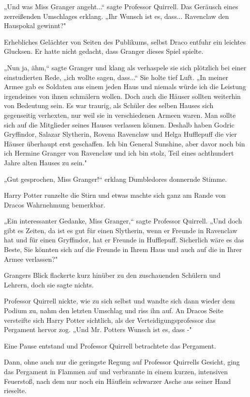 {„Und was Miss Granger angeht...“ sagte Professor Quirrell. Das Geräusch eines zerreißenden Umschlages erklang. „Ihr Wunsch ist es, dass... Ravenclaw den Hauspokal gewinnt?"

Erhebliches Gelächter von Seiten des Publikums, selbst Draco entfuhr ein leichtes Glucksen. Er hatte nicht gedacht, dass Granger dieses Spiel spielte.

„Nun ja, ähm,“ sagte Granger und klang als verhaspele sie sich plötzlich bei einer einstudierten Rede, „ich wollte sagen, dass...“ Sie holte tief Luft. „In meiner Armee gab es Soldaten aus einem jeden Haus und niemals würde ich die Leistung irgendeines von ihnen schmälern wollen. Doch auch die Häuser sollten weiterhin von Bedeutung sein. Es war traurig, als Schüler des selben Hauses sich gegenseitig verhexten, nur weil sie in verschiedenen Armeen waren. Man sollte sich auf die Mitglieder seines Hauses verlassen können. Deshalb haben Godric Gryffindor, Salazar Slytherin, Rovena Ravenclaw und Helga Hufflepuff die vier Häuser überhaupt erst geschaffen. Ich bin General Sunshine, aber davor noch bin ich Hermine Granger von Ravenclaw und ich bin stolz, Teil eines achthundert Jahre alten Hauses zu sein."

„Gut gesprochen, Miss Granger!“ erklang Dumbledores donnernde Stimme.

Harry Potter runzelte die Stirn und etwas machte sich ganz am Rande von Dracos Wahrnehmung bemerkbar.

„Ein interessanter Gedanke, Miss Granger,“ sagte Professor Quirrell. „Und doch gibt es Zeiten, da ist es gut für einen Slytherin, wenn er Freunde in Ravenclaw hat und für einen Gryffindor, hat er Freunde in Hufflepuff. Sicherlich wäre es das Beste, Sie könnten sich auf die Freunde in Ihrem Haus und auch auf die in Ihrer Armee verlassen?"

Grangers Blick flackerte kurz hinüber zu den zuschauenden Schülern und Lehrern, doch sie sagte nichts.

Professor Quirrell nickte, wie zu sich selbst und wandte sich dann wieder dem Podium zu, nahm den letzten Umschlag und riss ihn auf. An Dracos Seite versteifte sich Harry Potter sichtlich, als der Verteidigungsprofessor das Pergament hervor zog. „Und Mr. Potters Wunsch ist es, dass -"

Eine Pause entstand und Professor Quirrell betrachtete das Pergament.

Dann, ohne auch nur die geringste Regung auf Professor Quirrells Gesicht, ging das Pergament in Flammen auf und verbrannte in einem kurzen, intensiven Feuerstoß, nach dem nur noch ein Häuflein schwarzer Asche aus seiner Hand rieselte.

}
